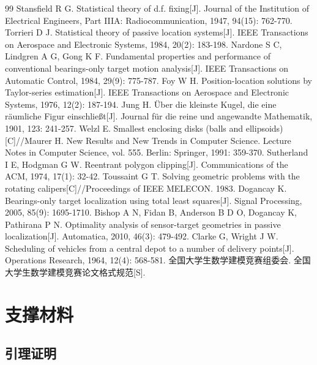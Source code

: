 \documentclass{cumcmthesis}
\begin{document}
\begin{thebibliography}{99}
 Stansfield R G. Statistical theory of d.f. fixing[J]. Journal of the Institution of Electrical Engineers, Part IIIA: Radiocommunication, 1947, 94(15): 762-770.
 Torrieri D J. Statistical theory of passive location systems[J]. IEEE Transactions on Aerospace and Electronic Systems, 1984, 20(2): 183-198.
 Nardone S C, Lindgren A G, Gong K F. Fundamental properties and performance of conventional bearings-only target motion analysis[J]. IEEE Transactions on Automatic Control, 1984, 29(9): 775-787.
 Foy W H. Position-location solutions by Taylor-series estimation[J]. IEEE Transactions on Aerospace and Electronic Systems, 1976, 12(2): 187-194.
 Jung H. \"{U}ber die kleinste Kugel, die eine r\"{a}umliche Figur einschlie{\ss}t[J]. Journal f\"{u}r die reine und angewandte Mathematik, 1901, 123: 241-257.
 Welzl E. Smallest enclosing disks (balls and ellipsoids)[C]//Maurer H. New Results and New Trends in Computer Science. Lecture Notes in Computer Science, vol. 555. Berlin: Springer, 1991: 359-370.
 Sutherland I E, Hodgman G W. Reentrant polygon clipping[J]. Communications of the ACM, 1974, 17(1): 32-42.
 Toussaint G T. Solving geometric problems with the rotating calipers[C]//Proceedings of IEEE MELECON. 1983.
 Dogancay K. Bearings-only target localization using total least squares[J]. Signal Processing, 2005, 85(9): 1695-1710.
 Bishop A N, Fidan B, Anderson B D O, Dogancay K, Pathirana P N. Optimality analysis of sensor-target geometries in passive localization[J]. Automatica, 2010, 46(3): 479-492.
 Clarke G, Wright J W. Scheduling of vehicles from a central depot to a number of delivery points[J]. Operations Research, 1964, 12(4): 568-581.
 全国大学生数学建模竞赛组委会. 全国大学生数学建模竞赛论文格式规范[S].
\end{thebibliography}

\appendix
\section{支撑材料}

\subsection{引理证明}
\label{app:lemmas}
\end{document}
